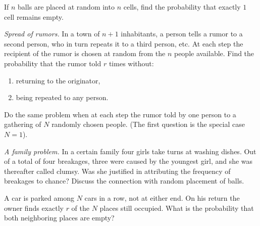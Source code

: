 \begin{problem}[Handout 2, \# 12]
  If \(n\) balls are placed at random into \(n\) cells, find the
  probability that exactly \(1\) cell remains empty.
\end{problem}
\begin{solution}
\end{solution}
\newpage


\begin{problem}[Handout 2, \# 13]
  \emph{Spread of rumors.} In a town of \(n+1\) inhabitants, a person tells
  a rumor to a second person, who in turn repeats it to a third person,
  etc. At each step the recipient of the rumor is chosen at random from the
  \(n\) people available. Find the probability that the rumor told \(r\)
  times without:
  \begin{enumerate}[label=(\alph*),noitemsep]
  \item returning to the originator,
  \item being repeated to any person.
  \end{enumerate}
  Do the same problem when at each step the rumor told by one person to a
  gathering of \(N\) randomly chosen people. (The first question is the
  special case \(N=1\)).
\end{problem}
\begin{solution}

\end{solution}
\newpage

\begin{problem}[Handout 2, \# 14]
  \emph{A family problem.} In a certain family four girls take turns at
  washing dishes. Out of a total of four breakages, three were caused by
  the youngest girl, and she was thereafter called clumsy. Was she
  justified in attributing the frequency of breakages to chance? Discuss
  the connection with random placement of balls.
\end{problem}
\begin{solution}

\end{solution}
\newpage

\begin{problem}[Handout 2, \# 15]
  A car is parked among \(N\) cars in a row, not at either end. On his
  return the owner finds exactly \(r\) of the \(N\) places still
  occupied. What is the probability that both neighboring places are empty?
\end{problem}
\begin{solution}

\end{solution}
\newpage

